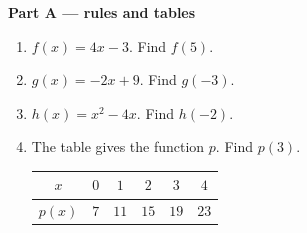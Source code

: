 \documentclass[12pt]{article}
\begin{document}
\vspace{0.25cm}
\noindent\textbf{Part A --- rules and tables}
\begin{enumerate}[label=\textbf{\arabic*.}, leftmargin=1.15cm, itemsep=0pt, topsep=6pt]

\item \begin{minipage}[t]{\linewidth}\vspace{0pt}
$f(x) = 4x - 3$. \quad Find $f(5)$.
\par\vspace*{3.2cm}\ansline
\end{minipage}

\item \begin{minipage}[t]{\linewidth}\vspace{0pt}
$g(x) = -2x + 9$. \quad Find $g(-3)$.
\par\vspace*{3.2cm}\ansline
\end{minipage}

\item \begin{minipage}[t]{\linewidth}\vspace{0pt}
$h(x) = x^2 - 4x$. \quad Find $h(-2)$.
\par\vspace*{3.4cm}\ansline
\end{minipage}

\item \begin{minipage}[t]{\linewidth}\vspace{0pt}
The table gives the function $p$. \quad Find $p(3)$.
\par\vspace{0.15cm}
\begin{center}
\begin{tabular}{|c|c|c|c|c|c|}
\hline
\textbf{$x$} & $0$ & $1$ & $2$ & $3$ & $4$ \\
\hline
\textbf{$p(x)$} & $7$ & $11$ & $15$ & $19$ & $23$ \\
\hline
\end{tabular}
\end{center}
\par\vspace*{2.9cm}\ansline
\end{minipage}


\end{enumerate}
\end{document}
